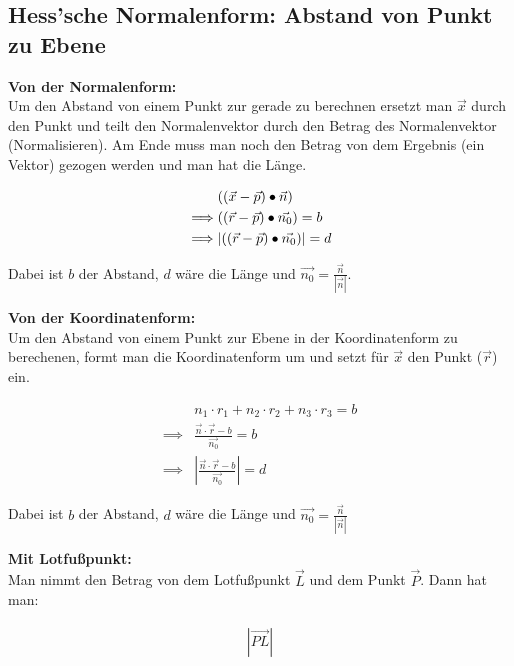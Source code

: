 \subsection{Hess'sche Normalenform: Abstand von Punkt zu Ebene}

\textbf{Von der Normalenform:} \\
Um den Abstand von einem Punkt zur gerade zu berechnen ersetzt man $\vec{x}$ durch den Punkt und teilt den Normalenvektor durch den Betrag des  Normalenvektor (Normalisieren). Am Ende muss man noch den Betrag von dem Ergebnis (ein Vektor) gezogen werden und man hat die Länge.

\[
\begin{aligned}
    &((\vec{x} - \vec{p}) \bullet \vec{n}) \newline \\
    \implies &((\vec{r} - \vec{p}) \bullet \vec{n_0}) = b \\
    \implies &|((\vec{r} - \vec{p}) \bullet \vec{n_0})| = d
\end{aligned}
\]

Dabei ist $b$ der Abstand, $d$ wäre die Länge und $\vec{n_0} = \frac{\vec{n}}{|\vec{n}|}$.

\vspace{0.5cm}

\textbf{Von der Koordinatenform:} \\
Um den Abstand von einem Punkt zur Ebene in der Koordinatenform zu berechenen, formt man die Koordinatenform um und setzt für $\vec{x}$ den Punkt ($\vec{r}$) ein.

\[
\begin{aligned}
    &n_1\cdot r_1 + n_2\cdot r_2 + n_3\cdot r_3 = b \\
    \implies &\frac{\vec{n}\cdot \vec{r} - b}{\vec{n_0}} = b \\
    \implies &|\frac{\vec{n}\cdot \vec{r} - b}{\vec{n_0}}| = d
\end{aligned}
\]

Dabei ist $b$ der Abstand, $d$ wäre die Länge und $\vec{n_0} = \frac{\vec{n}}{|\vec{n}|}$ 

\vspace{0.5cm}

\textbf{Mit Lotfußpunkt:} \\
Man nimmt den Betrag von dem Lotfußpunkt $\vec{L}$ und dem Punkt $\vec{P}$. Dann hat man: 

\[
\begin{aligned}
    |\overrightarrow{PL}|
\end{aligned}
\]

